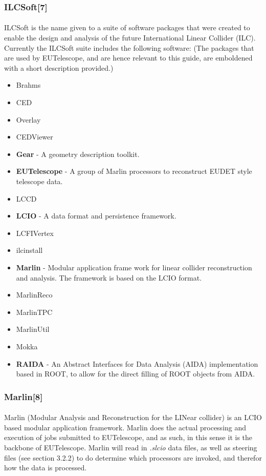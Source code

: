 \documentclass[11pt]{article}
\begin{document}
\subsubsection{ILCSoft[7]}
\paragraph{}
ILCSoft is the name given to a suite of software packages that were created to enable the design and analysis of the future International Linear Collider (ILC). Currently the ILCSoft suite includes the following software: (The packages that are used by EUTelescope, and are hence relevant to this guide, are emboldened with a short description provided.) 
\begin{itemize}
\item Brahms
\item CED
\item Overlay
\item CEDViewer
\item \textbf{Gear} - A geometry description toolkit.
\item \textbf{EUTelescope} - A group of Marlin processors to reconstruct EUDET style telescope data.
\item LCCD
\item \textbf{LCIO} - A data format and persistence framework. 
\item LCFIVertex
\item ilcinstall
\item \textbf{Marlin} - Modular application frame work for linear collider reconstruction and analysis. The framework is based on the LCIO format.
\item MarlinReco
\item MarlinTPC
\item MarlinUtil
\item Mokka
\item \textbf{RAIDA} - An Abstract Interfaces for Data Analysis (AIDA) implementation based in ROOT, to allow for the direct filling of ROOT objects from AIDA.
\end{itemize}
\subsubsection{Marlin[8]}
\paragraph{}
Marlin (Modular Analysis and Reconstruction for the LINear collider) is an LCIO based modular application framework. Marlin does the actual processing and execution of jobs submitted to EUTelescope, and as such, in this sense it is the backbone of EUTelescope. Marlin will read in \textit{.slcio} data files, as well as steering files (see section 3.2.2) to do determine which processors are invoked, and therefor how the data is processed.
\end{document}
